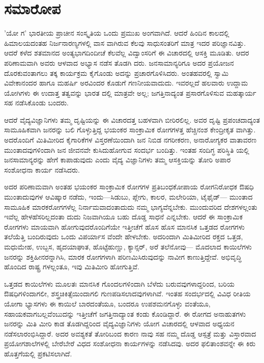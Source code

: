 
\chapter{ ಸಮಾರೋಪ}

'ಯೋ ಗ' ಭಾರತೀಯ ಪ್ರಾಚೀನ ಸಂಸ್ಕೃತಿಯ ಒಂದು ಪ್ರಮುಖ ಅಂಗವಾಗಿದೆ. ಆದರೆ ಹಿಂದಿನ ಕಾಲದಲ್ಲಿ ಹಿಮಾಲಯದಂತಹ ನಿರ್ಜನಾರಣ್ಯಗಳಲ್ಲಿ ವಾಸ ವಾಗಿರುವ ಕೆಲವು ಸಾಧುಸಂತರಿಗೆ ಮಾತ್ರ ಇದರ ಪರಿಜ್ಞಾನವಿತ್ತು. ಆದರೆ ಕಳೆದ ಶತಮಾನದ ಅಂತ್ಯಭಾಗದಿಂದೀಚೆ ಕೆಲವೆಲ್ಲ ವಿದ್ವಾಂಸರಿಗೆ ಈ ವಿಚಾರದಲ್ಲಿ ಆಸಕ್ತಿ ಮೂಡಿತು. ಆದರ ಪರಿಣಾಮವಾಗಿ ಅವರು ಆಳವಾದ ಅಭ್ಯಾಸ ನಡೆಸ ತೊಡಗಿ ದರು. ಜನಸಾಮಾನ್ಯರಿಗೂ ಅದರ ಪ್ರಯೋಜನ ದೊರಕುವಂತಾಗಲು ತಕ್ಕ ಕಾರ್ಯಕ್ರಮ ಕೈಗೊಂಡು ಅದನ್ನು ಪ್ರಚಾರಗೊಳಿಸಿದರು. ಅಂತಹವರಲ್ಲಿ ಸ್ವಾಮಿ ವಿವೇಕಾನಂದರ ಹಾಗೂ ಮಹರ್ಷಿ ಅರವಿಂದರ ಕೊಡುಗೆ ಗಣನೀಯವಾದುದು. ಇವರಲ್ಲದೆ ಹಲವಾರು ಉದ್ದಾಮ ಯೋಗಿಗಳು ಈ ಉದಾತ್ತ ತತ್ವವನ್ನು ಭಾರತ ದಲ್ಲಿ ಮಾತ್ರವೇ ಅಲ್ಲ; ಜಗತ್ತಿನಾದ್ಯಂತ ಪ್ರಸಾರಗೊಳಿಸುವ ಮಹತ್ಕಾರ್ಯ ಸಹ ನಡೆಸಿಕೊಂಡು ಬಂದರು.

ಆದರೆ ವೈದ್ಯವಿಜ್ಞಾನಿಗಳು ತಮ್ಮ ದೃಷ್ಟಿಯನ್ನು ಈ ವಿಚಾರದತ್ತ ಬಹಳವಾಗಿ ಬೀರಿರಲಿಲ್ಲ. ಅವರ ದೃಷ್ಟಿ ಪ್ರಪಂಚದಾದ್ಯಂತ ಸಾಮೂಹಿಕವಾಗಿ ಜನರನ್ನು ಬಲಿ ಗೊಳ್ಳುತ್ತಿದ್ದ ಭಯಂಕರ ಸಾಂಕ್ರಾಮಿಕ ರೋಗಗಳತ್ತ ಹೆಚ್ಚಿನಂಶ ಕೇಂದ್ರೀಕೃತ ವಾಗಿತ್ತು. ಅದರೊಂದಿಗೆ ಮಿತಿಮೀರಿದ ಕೈಗಾರಿಕೆಗಳ ವಿಸ್ತರಣೆಯಿಂದಾಗಿ ಜನ ನಿಬಿಡ ನಗರೀಕರಣ, ಅನಾರೋಗ್ಯಕರ ವಾತಾವರಣ ಮುಂತಾದವುಗಳಿಂದಾಗಿ ಜನ ಜೀವನವೇ ಕುಸಿದುಹೋಗುವ ಸಂದರ್ಭ ಬಂದಿತ್ತು. ಇಂತಹ ಸಂದಿಗ್ಧ ಪರಿಸ್ಥಿತಿ ಯಲ್ಲಿ ಜನಸಾಮಾನ್ಯರನ್ನು ಹೇಗೆ ಕಾಪಾಡುವುದು ಎಂದು ವೈದ್ಯ ವಿಜ್ಞಾನಿಗಳು ತಮ್ಮ ಆಸಕ್ತಿಯನ್ನು ತೋರಿ ಅಪಾರ ಸಂಶೋಧನಾ ಕಾರ್ಯ ನಡೆಸಿದರು.

ಅದರ ಪರಿಣಾಮವಾಗಿ ಅಂತಹ ಭಯಂಕರ ಸಾಂಕ್ರಾಮಿಕ ರೋಗಗಳ ಪ್ರತಿಬಂಧಕೋಪಾಯ ರೋಗನಿರೋಧಕ ಔಷಧಿ ಮುಂತಾದುವುಗಳ ಆವಿಷ್ಕಾರ ನಡೆದು, ಇಂದು—ಸಿಡುಬು, ಪ್ಲೇಗು, ಕಾಲರ, ಮಲೇರಿಯಾ, ಟೈಫೈಡ್​— ಮುಂತಾದ ಸಾಮೂಹಿಕ ಮಾರಕರೋಗಗಳೆಲ್ಲ ನಿರ್ನಾಮವಾದಂತಾದುದು ನಮ್ಮ ಭಾಗ್ಯವೆನ್ನಬೇಕು. ಮುಂದುವರಿದ ದೇಶಗಳಲ್ಲಂತು ಇವೆಲ್ಲ ಹೇಳಹೆಸರಿಲ್ಲದಂತಾ ದುದು ನಿಜವಾಗಿಯೂ ಬಹು ದೊಡ್ಡ ಸಾಧನೆ ಎನ್ನಬೇಕು. ಆದರೆ ಈ ಸಾಂಕ್ರಾಮಿಕ ರೋಗಗಳು ಮಾಯವಾಗಿ ಹೋಗುವುದರೊಂದಿಗೆಯೇ ಇತ್ತೀಚೆಗೆ ಹೊಸ ಹೊಸ ಮಾನಸಿಕ ಒತ್ತಡದ ರೋಗಗಳು ತಲೆಯೆತ್ತಿ ಬಂದಿರುವುದು ಒಂದು ವಿಪರ್ಯಾಸ ವೆಂದೇ ಹೇಳಬೇಕು. ಅದರಿಂದಾಗಿ ಮಿತಿಮೀರಿದ ರಕ್ತದ ಒತ್ತಡ, ಮಧುಮೇಹ, ಉಬ್ಬಸ, ಹೃದಯಾಘಾತ, ಹೊಟ್ಟೆಹುಣ್ಣು, ಕ್ಯಾನ್ಸರ್, ಅರೆ ತಲೆನೋವು— ಮೊದಲಾದ ಕಾಯಿಲೆಗಳು ಜನರನ್ನು ಶಕ್ತಿಹೀನರನ್ನಾಗಿಸಿ, ಮಾರಕ ರೋಗಗಳಾಗಿ ಪರಿಣಮಿಸಿರುವುದನ್ನು ನಾವೀಗ ಕಾಣುತ್ತಿದ್ದೇವೆ. ಅಭಿವೃದ್ಧಿ ಹೊಂದಿದ ರಾಷ್ಟ್ರ ಗಳಲ್ಲಂತೂ, ಇವು ಮಿತಿಮೀರಿ ಹೋಗುತ್ತಿವೆ.

ಒತ್ತಡದ ಕಾಯಿಲೆಗಳು ಮೂಲತಃ ಮಾನಸಿಕ ಗೊಂದಲಗಳಿಂದಾಗಿ ಬೆಳೆದು ಬರುವವುಗಳಾದ್ದರಿಂದ, ಬರಿಯ ಔಷಧಿಗಳಿಂದಾಗಲೀ, ಶಸ್ತ್ರಚಿಕಿತ್ಸೆಯಿಂದಾಗಲಿ ಗುಣಪಡಿಸಲಾದವುಗಳಾಗಿವೆ. ಇಂತಹ ಸಂದರ್ಭದಲ್ಲಿ ವಿವಿಧ ರೀತಿಯ ಯೋಗಾ ಭ್ಯಾಸಗಳು ಈ ಕಾಯಿಲೆ ಬಾರದಂತೆಯೂ, ಬಂದರೂ ಉಪಶಮನಗೊಳ್ಳು ವಂತೆಯೂ, ಸಹಾಯಕವಾಗಬಲ್ಲವೆಂಬುದನ್ನು ಇತ್ತೀಚೆಗೆ ಜಗತ್ತಿನಾದ್ಯಾಂತ ಕಂಡು ಕೊಂಡಿದ್ದಾರೆ. ಈ ರೋಗದ ಅನಾಹುತಗಳು ಜನರನ್ನು ಮಿತಿ ಮೀರಿ ಕಾಡ ತೊಡಗಿದ್ದರಿಂದ ವೈದ್ಯವಿಜ್ಞಾನಿಗಳು ಯೋಗ ವಿಚಾರದಲ್ಲಿ ಆಳವಾದ ಅಧ್ಯಯನ ನಡೆಸಲಾರಂಭಿಸಿದ್ದಾರೆ. ಅದರ ಅವಶ್ಯಕತೆ ತೋರಿಬಂದ ಕಾರಣ ನಾವು ಸಹ ನಮ್ಮ ದೊಡ್ಡ ಆಸ್ಪತ್ರೆ ಮತ್ತು ವಿಸ್ತಾರವಾದ ಪ್ರಯೋಗಶಾಲೆಗಳಲ್ಲಿ ಬೇರೆಬೇರೆ ವಿಧದ ಸಂಶೋಧನಾ ಕಾರ್ಯಗಳನ್ನು ನಡೆಸಿದವು. ಅದರ ಫಲಿತಾಂಶವನ್ನೇ ಈ ಕಿರು ಹೊತ್ತಗೆಯಲ್ಲಿ ಪ್ರಕಟಿಸಲಾಗಿದೆ.

